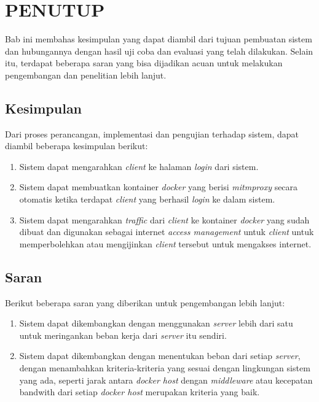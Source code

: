 \chapter{PENUTUP}
    Bab ini membahas kesimpulan yang dapat diambil dari tujuan pembuatan sistem dan hubungannya dengan hasil uji coba dan evaluasi yang telah dilakukan. Selain itu, terdapat beberapa saran yang bisa dijadikan acuan untuk melakukan pengembangan dan penelitian lebih lanjut.
        
\section{Kesimpulan}
Dari proses perancangan, implementasi dan pengujian terhadap sistem, dapat diambil beberapa kesimpulan berikut:
\begin{enumerate}
\item Sistem dapat mengarahkan \textit{client} ke halaman \textit{login} dari sistem.
\item Sistem dapat membuatkan kontainer \textit{docker} yang berisi \textit{mitmproxy} secara otomatis ketika terdapat \textit{client} yang berhasil \textit{login} ke dalam sistem.
\item Sistem dapat mengarahkan \textit{traffic} dari \textit{client} ke kontainer \textit{docker} yang sudah dibuat dan digunakan sebagai internet \textit{access management} untuk \textit{client} untuk memperbolehkan atau mengijinkan \textit{client} tersebut untuk mengakses internet. 
\end{enumerate}

\section{Saran}
Berikut beberapa saran yang diberikan untuk pengembangan lebih lanjut:
\begin{enumerate}
\item Sistem dapat dikembangkan dengan menggunakan \textit{server} lebih dari satu untuk meringankan beban kerja dari \textit{server} itu sendiri.
\item Sistem dapat dikembangkan dengan menentukan beban dari setiap \textit{server}, dengan menambahkan kriteria-kriteria yang sesuai dengan lingkungan sistem yang ada, seperti jarak antara \textit{docker host} dengan \textit{middleware} atau kecepatan bandwith dari setiap \textit{docker host} merupakan kriteria yang baik. 
\end{enumerate}